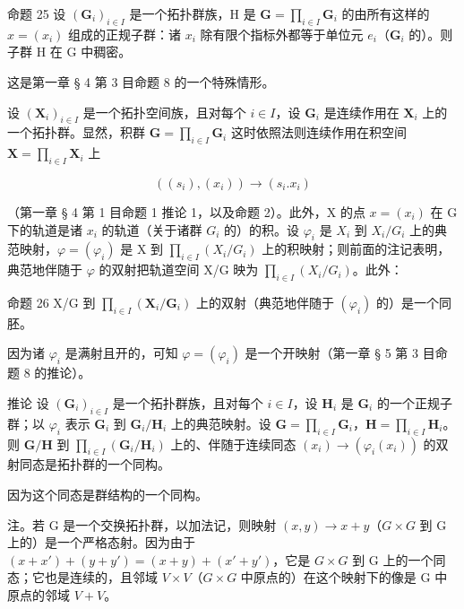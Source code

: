 命题 25 设 \((\mathbf{G}_{i})_{i\in I}\) 是一个拓扑群族，H 是 \(\mathbf{G} = \prod_{i\in I}\mathbf{G}_i\) 的由所有这样的 \(x = (x_{i})\) 组成的正规子群：诸 \(x_{i}\) 除有限个指标外都等于单位元 \(e_i\)（\(\mathbf{G}_i\) 的）。则子群 H 在 G 中稠密。

这是第一章 § 4 第 3 目命题 8 的一个特殊情形。

设 \((\mathbf{X}_i)_{i \in I}\) 是一个拓扑空间族，且对每个 \(i \in I\)，设 \(\mathbf{G}_i\) 是连续作用在 \(\mathbf{X}_i\) 上的一个拓扑群。显然，积群 \(\mathbf{G} = \prod_{i \in I} \mathbf{G}_i\) 这时依照法则连续作用在积空间 \(\mathbf{X} = \prod_{i \in I} \mathbf{X}_i\) 上

\[
\left(\left(s _ {i}\right), \left(x _ {i}\right)\right)\rightarrow \left(s _ {i}. x _ {i}\right)
\]

（第一章 § 4 第 1 目命题 1 推论 1，以及命题 2）。此外，X 的点 \(x = (x_{i})\) 在 G 下的轨道是诸 \(x_{i}\) 的轨道（关于诸群 \(G_{i}\) 的）的积。设 \(\varphi_{i}\) 是 \(X_{i}\) 到 \(X_{i}/G_{i}\) 上的典范映射，\(\varphi = (\varphi_{i})\) 是 X 到 \(\prod_{i\in I}(X_{i}/G_{i})\) 上的积映射；则前面的注记表明，典范地伴随于 \(\varphi\) 的双射把轨道空间 X/G 映为 \(\prod_{i\in I}(X_{i}/G_{i})\)。此外：

命题 26 X/G 到 \(\prod_{i\in I}(\mathbf{X}_i / \mathbf{G}_i)\) 上的双射（典范地伴随于 \((\varphi_i)\) 的）是一个同胚。

因为诸 \(\varphi_{i}\) 是满射且开的，可知 \(\varphi = (\varphi_{i})\) 是一个开映射（第一章 § 5 第 3 目命题 8 的推论）。

推论 设 \((\mathbf{G}_{i})_{i\in I}\) 是一个拓扑群族，且对每个 \(i\in I\)，设 \(\mathbf{H}_i\) 是 \(\mathbf{G}_i\) 的一个正规子群；以 \(\varphi_i\) 表示 \(\mathbf{G}_i\) 到 \(\mathbf{G}_i / \mathbf{H}_i\) 上的典范映射。设 \(\mathbf{G} = \prod_{i\in I}\mathbf{G}_i\)，\(\mathbf{H} = \prod_{i\in I}\mathbf{H}_i\)。则 \(\mathbf{G} / \mathbf{H}\) 到 \(\prod_{i\in I}(\mathbf{G}_i / \mathbf{H}_i)\) 上的、伴随于连续同态 \((x_i)\to (\varphi_i(x_i))\) 的双射同态是拓扑群的一个同构。

因为这个同态是群结构的一个同构。

注。若 G 是一个交换拓扑群，以加法记，则映射 \((x,y)\to x+y\)（\(G\times G\) 到 G 上的）是一个严格态射。因为由于 \((x+x')+(y+y')=(x+y)+(x'+y')\)，它是 \(G\times G\) 到 G 上的一个同态；它也是连续的，且邻域 \(V\times V\)（\(G\times G\) 中原点的）在这个映射下的像是 G 中原点的邻域 \(V+V\)。

